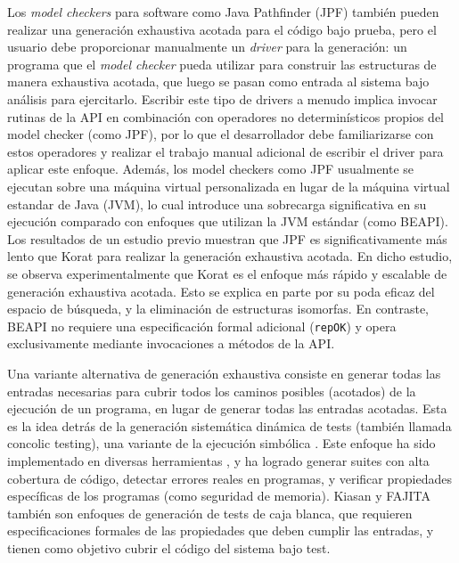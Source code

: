 Los \emph{model checkers} para software como \textsf{Java Pathfinder}
\cite{Visser05} (\textsf{JPF}) también pueden realizar una generación exhaustiva
acotada para el código bajo prueba, pero el usuario debe proporcionar manualmente un 
\emph{driver} para la generación: un programa que el \emph{model checker} pueda
utilizar para construir las estructuras de manera exhaustiva acotada, que luego
se pasan como entrada al sistema bajo análisis para ejercitarlo. 
Escribir este tipo de drivers a menudo implica invocar rutinas de la API en
combinación con operadores no determinísticos propios del model checker (como
\textsf{JPF}), por lo que 
el desarrollador debe familiarizarse con estos operadores y realizar el trabajo
manual adicional de escribir el driver para aplicar este enfoque.
Además, los model checkers como \textsf{JPF} usualmente se ejecutan sobre una máquina virtual personalizada en lugar de la máquina virtual estandar de Java (\textsf{JVM}), lo cual introduce una 
sobrecarga significativa en su ejecución comparado con enfoques que utilizan la
\textsf{JVM} estándar (como \textsf{BEAPI}). Los resultados de un estudio previo 
\cite{Siddiqui09} muestran que \textsf{JPF} es significativamente más lento que
\textsf{Korat} para realizar la generación exhaustiva acotada. En dicho estudio,
se observa experimentalmente que \textsf{Korat} es el enfoque más rápido y
escalable de generación exhaustiva acotada. Esto se explica en parte por su poda
eficaz del espacio de búsqueda, y la eliminación de estructuras isomorfas. 
En contraste, \textsf{BEAPI} no requiere una especificación formal adicional
(\texttt{repOK}) y opera exclusivamente mediante invocaciones a métodos de la API.

Una variante alternativa de generación exhaustiva consiste en generar todas las
entradas necesarias para cubrir todos los caminos posibles (acotados) de
la ejecución de un programa, en lugar de generar todas las entradas acotadas.
Esta es la idea detrás de la generación sistemática dinámica de tests (también llamada
concolic testing), una variante de la ejecución 
simbólica \cite{Godefroid18}. Este enfoque ha sido implementado en diversas herramientas \cite{Godefroid12,Godefroid05,Pham19,Christakis15}, y ha logrado 
generar suites con alta cobertura de código, detectar errores reales en
programas, y verificar propiedades específicas de los programas (como seguridad
de memoria).
\textsf{Kiasan} \cite{Deng06} y \textsf{FAJITA} \cite{Abad13} también son
enfoques de generación de tests de caja blanca, que requieren especificaciones 
formales de las propiedades que deben cumplir las entradas, y tienen como objetivo cubrir el código del sistema bajo test.

